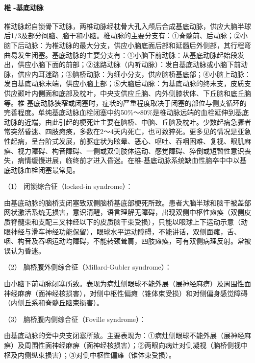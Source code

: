 \paragraph{椎 -基底动脉}

椎动脉起自锁骨下动脉，两椎动脉经枕骨大孔入颅后合成基底动脉，供应大脑半球后1/3及部分间脑、脑干和小脑。椎动脉的主要分支有：①脊髓前、后动脉；②小脑下后动脉：为椎动脉的最大分支，供应小脑底面后部和延髓后外侧部，其行程弯曲易发生闭塞。基底动脉的主要分支有：①小脑下前动脉：从基底动脉起始段发出，供应小脑下面的前部；②迷路动脉（内听动脉）：发自基底动脉或小脑下前动脉，供应内耳迷路；③脑桥动脉：为细小分支，供应脑桥基底部；④小脑上动脉：发自基底动脉末端，供应小脑上部；⑤大脑后动脉：为基底动脉的终末支，皮质支供应颞叶内侧面和底部及枕叶，中央支供应丘脑、内外侧膝状体、下丘脑和底丘脑等。椎-基底动脉狭窄或闭塞时，症状的严重程度取决于闭塞的部位与侧支循环的完善程度。单纯基底动脉血栓闭塞中约50\%～80\%是椎动脉远端的血栓延伸到基底动脉的近端，由此引起的梗死灶主要在脑桥、中脑、丘脑及枕叶。少数起病急骤者常突然昏迷、四肢瘫痪，多数在2～4天内死亡，也可致猝死。更多见的情况是亚急性起病，呈台阶式发展，前驱症状为眩晕、恶心、呕吐、吞咽困难、复视、眼肌麻痹、视力障碍、构音障碍、一侧或双侧肢体运动、感觉障碍、猝倒或短暂性意识丧失，病情缓慢进展，临终前才进入昏迷。在椎-基底动脉系统缺血性脑卒中中以基底动脉血栓闭塞最常见。

\hypertarget{text00242.htmlux5cux23CHP8-1-2-2-1-2-4-1}{}
（1） 闭锁综合征（locked-in syndrome）：

由基底动脉的脑桥支闭塞致双侧脑桥基底部梗死所致。患者大脑半球和脑干被盖部网状激活系统无损害，意识清醒，语言理解无障碍，出现双侧中枢性瘫痪（双侧皮质脊髓束和支配三叉神经以下的皮质脑干束受损），只能以眼球上下运动示意（动眼神经与滑车神经功能保留），眼球水平运动障碍，不能讲话，双侧面瘫，舌、咽、构音及吞咽运动均障碍，不能转颈耸肩，四肢瘫痪，可有双侧病理反射。常被误认为昏迷。

\hypertarget{text00242.htmlux5cux23CHP8-1-2-2-1-2-4-2}{}
（2） 脑桥腹外侧综合征（Millard-Gubler syndrome）：

由小脑下前动脉闭塞所致。表现为病灶侧眼球不能外展（展神经麻痹）及周围性面神经麻痹（面神经核损害），对侧中枢性偏瘫（锥体束受损）和对侧偏身感觉障碍（内侧丘系和脊髓丘脑束损害）。

\hypertarget{text00242.htmlux5cux23CHP8-1-2-2-1-2-4-3}{}
（3） 脑桥腹内侧综合征（Foville syndrome）：

由基底动脉的旁中央支闭塞所致。主要表现为：①病灶侧眼球不能外展（展神经麻痹）及周围性面神经麻痹（面神经核损害）；②两眼向病灶对侧凝视（脑桥侧视中枢及内侧纵束损害）；③对侧中枢性偏瘫（锥体束受损）。

